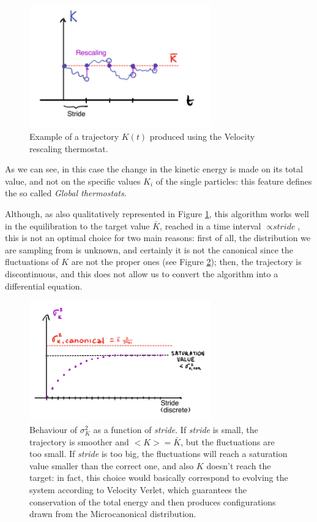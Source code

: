 \begin{figure}
    \centering
    \includegraphics[width=0.7\textwidth]{Thermostats/images/velocity rescaling.PNG}
    \caption{Example of a trajectory $K(t)$ produced using the Velocity rescaling thermostat.}
    \label{fig:velocity rescaling}
\end{figure}		

As we can see, in this case the change in the kinetic energy is made on its total value, and not on the specific values $K_i$ of the single particles: this feature defines the so called \textit {Global thermostats}.

Although, as also qualitatively represented in Figure \ref{fig:velocity rescaling}, this algorithm works well in the equilibration to the target value $\bar K$, reached in a time interval $\propto {\textit {stride}}$, this is not an optimal choice for two main reasons: first of all, the distribution we are sampling from is unknown, and certainly it is not the canonical since the fluctuations of $K$ are not the proper ones (see Figure \ref{fig:fluctuations}); then, the trajectory is discontinuous, and this does not allow us to convert the algorithm into a differential equation.

\begin{figure}
    \centering
    \includegraphics[width=0.7\textwidth]{Thermostats/images/fluctuations.PNG}
    \caption{Behaviour of $\sigma_K^2$ as a function of \textit {stride}. If \textit {stride} is small, the trajectory is smoother and $<K>=\bar K$, but the fluctuations are too small. If \textit{stride} is too big, the fluctuations will reach a saturation value smaller than the correct one, and also $K$ doesn't reach the target: in fact, this choice would basically correspond to evolving the system according to Velocity Verlet, which guarantees the conservation of the total energy and then produces configurations drawn from the Microcanonical distribution. }
    \label{fig:fluctuations}
\end{figure}

